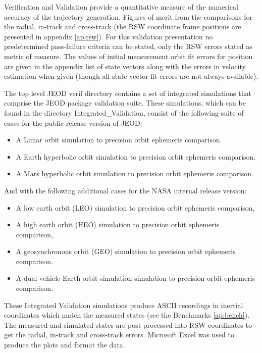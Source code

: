 Verification and Validation provide a quantitative measure of the numerical accuracy
of the trajectory generation. Figures of merit from the comparisons for the radial,
in-track and cross-track (the RSW coordinate frame positions are presented in
appendix \ref{ap:rsw}).  For this validation presentation no predetermined pass-failure
criteria can be stated, only the RSW errors stated as metric of measure. The values
of initial measurement orbit fit errors for position are given in the appendix list
of state vectors along with the errors in velocity estimation when given (though all
state vector fit errors are not always available).

The top level JEOD verif directory contains a set of integrated simulations that comprise
the JEOD package validation suite.  These simulations, which can be found in the directory
Integrated\_Validation, consist of the following suite of cases for the public release
version of JEOD:
\begin{itemize}
\item A Lunar orbit simulation to precision orbit ephemeris comparison.
\item A Earth hyperbolic orbit simulation to precision orbit ephemeris comparison.
\item A Mars hyperbolic orbit simulation to precision orbit ephemeris comparison.

\end{itemize}

And with the following additional cases for the NASA internal release version:
\begin{itemize}
\item A low earth orbit (LEO) simulation to precision orbit ephemeris comparison,
\item A high earth orbit (HEO) simulation to precision orbit ephemeris comparison,
\item A geosynchronous orbit (GEO) simulation to precision orbit ephemeris comparison.
\item A dual vehicle Earth orbit simulation simulation to precision orbit ephemeris comparison.

\end{itemize}

These Integrated Validation simulations produce ASCII recordings in inertial coordinates
which match the measured states (see the Benchmarks \ref{ap:bench}).   The measured
and simulated states are post processed into RSW coordinates to get the radial, in-track
and cross-track errors. Microsoft Excel was used to produce the plots and format the data.


